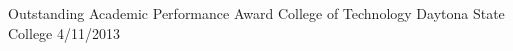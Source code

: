 \begin{cvhonors}
	\cvhonor
		{Outstanding Academic Performance Award}
		{College of Technology}
		{Daytona State College}
		{4/11/2013}
\end{cvhonors}

